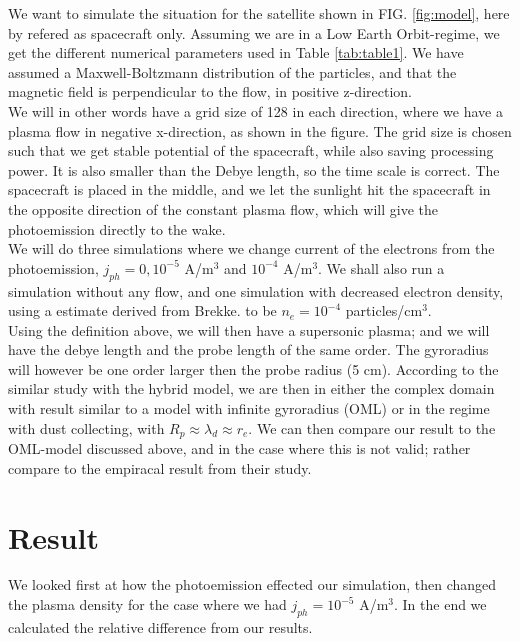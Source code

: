 \documentclass[aip, 
rsi, 
amsmath,
amssymb,
longbibliography,
preprint]{revtex4-1}
\begin{document}
We want to simulate the situation for the satellite shown in FIG. \ref{fig:model}, here by refered as spacecraft only. Assuming we are in a Low Earth Orbit-regime, we get the different numerical parameters used in Table \ref{tab:table1}. We have  assumed a Maxwell-Boltzmann distribution of the particles, and that the magnetic field is perpendicular to the flow, in positive z-direction.\\

 We will in other words have a grid size of 128 in each direction, where we have a plasma flow in negative x-direction, as shown in the figure. The grid size is chosen such that we get stable potential of the spacecraft, while also saving processing power. It is also smaller than the Debye length, so the time scale is correct. The spacecraft is placed in the middle, and we let the sunlight hit the spacecraft in the opposite direction of the constant plasma flow, which will give the photoemission directly to the wake.\\
 
 We will do three simulations where we change current of the electrons from the photoemission, $j_{ph} = 0, 10^{-5}$ A/m$^3$ and $10^{-4}$ A/m$^3$. We shall also run a simulation without any flow, and one simulation with decreased electron density, using a estimate derived from Brekke.\cite{Brekke} to be $n_e = 10^{-4}$ particles/cm$^3$.\\
 
Using the definition above, we will then have a supersonic plasma; and we will have the debye length and the probe length of the same order. The gyroradius will however be one order larger then the probe radius (5 cm). According to the similar study with the hybrid model\cite{P7}, we are then in either the complex domain with result similar to a model with infinite gyroradius (OML) or in the regime with dust collecting, with $R_p \approx \lambda_d \approx r_e$. We can then compare our result to the OML-model discussed above, and in the case where this is not valid; rather compare to the empiracal result from their study.

\section{Result}

We looked first at how the photoemission effected our simulation, then changed the plasma density for the case where we had $j_{ph} = 10^{-5}$ A/m$^3$. In the end we calculated the relative difference from our results.
\end{document}
